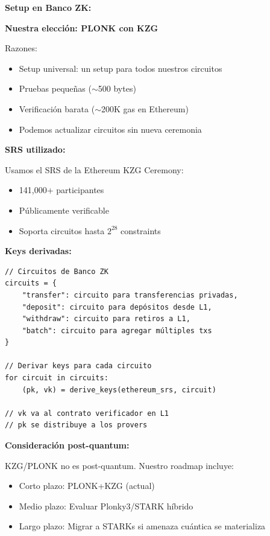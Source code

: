 \documentclass[11pt,a4paper,twoside,openright]{book}
\theoremstyle{definition}
\theoremstyle{plain}
\theoremstyle{remark}
\begin{document}
\begin{bancozk}
\textbf{Setup en Banco ZK:}

\textbf{Nuestra elección: PLONK con KZG}

Razones:
\begin{itemize}
    \item Setup universal: un setup para todos nuestros circuitos
    \item Pruebas pequeñas ($\sim$500 bytes)
    \item Verificación barata ($\sim$200K gas en Ethereum)
    \item Podemos actualizar circuitos sin nueva ceremonia
\end{itemize}

\textbf{SRS utilizado:}

Usamos el SRS de la Ethereum KZG Ceremony:
\begin{itemize}
    \item 141,000+ participantes
    \item Públicamente verificable
    \item Soporta circuitos hasta $2^{28}$ constraints
\end{itemize}

\textbf{Keys derivadas:}

\begin{verbatim}
// Circuitos de Banco ZK
circuits = {
    "transfer": circuito para transferencias privadas,
    "deposit": circuito para depósitos desde L1,
    "withdraw": circuito para retiros a L1,
    "batch": circuito para agregar múltiples txs
}

// Derivar keys para cada circuito
for circuit in circuits:
    (pk, vk) = derive_keys(ethereum_srs, circuit)
    
// vk va al contrato verificador en L1
// pk se distribuye a los provers
\end{verbatim}

\textbf{Consideración post-quantum:}

KZG/PLONK no es post-quantum. Nuestro roadmap incluye:
\begin{itemize}
    \item Corto plazo: PLONK+KZG (actual)
    \item Medio plazo: Evaluar Plonky3/STARK híbrido
    \item Largo plazo: Migrar a STARKs si amenaza cuántica se materializa
\end{itemize}
\end{bancozk}
\end{document}
